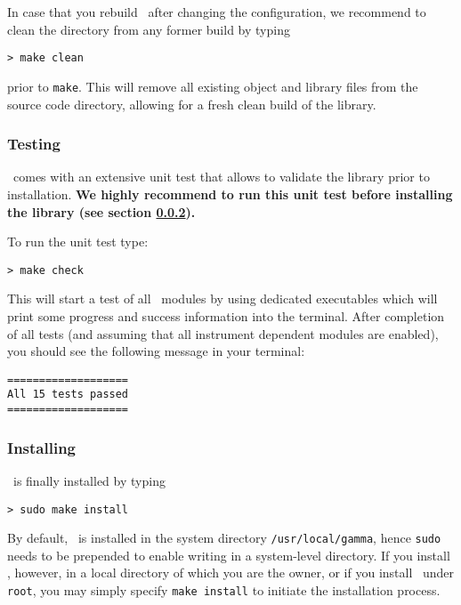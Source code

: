 \documentclass{article}[12pt,a4]
\begin{document}
In case that you rebuild \this\ after changing the configuration, we recommend to clean the
directory from any former build by typing
\begin{verbatim}
> make clean
\end{verbatim}
prior to {\tt make}.
This will remove all existing object and library files from the source code directory, allowing for
a fresh clean build of the library.


\subsubsection{Testing \this}

\this\ comes with an extensive unit test that allows to validate the library prior to installation.
{\bf We highly recommend to run this unit test before installing the library (see section \ref{sec:install}).}

To run the unit test type:
\begin{verbatim}
> make check
\end{verbatim}
This will start a test of all \this\ modules by using dedicated executables which will print some
progress and success information into the terminal.
After completion of all tests (and assuming that all instrument dependent modules are enabled),
you should see the following message in your terminal:
\begin{verbatim}
===================
All 15 tests passed
===================
\end{verbatim}


\subsubsection{Installing \this}
\label{sec:install}

\this\ is finally installed by typing
\begin{verbatim}
> sudo make install
\end{verbatim}
By default, \this\ is installed in the system directory {\tt /usr/local/gamma}, hence
{\tt sudo} needs to be prepended to enable writing in a system-level directory.
If you install \this, however, in a local directory of which you are the owner, or if you install
\this\ under {\tt root}, you may simply specify {\tt make install} to initiate the installation
process.
\end{document}
